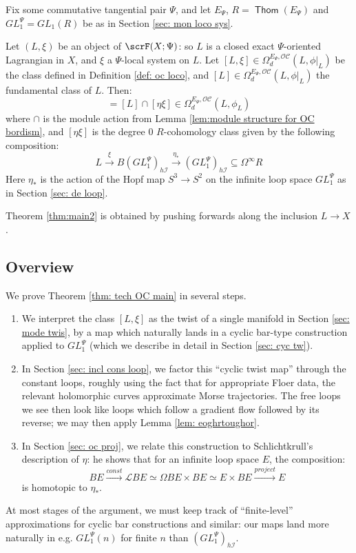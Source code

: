 \documentclass{TPmod}
\DeclareMathOperator{\Thom}{\mathsf{Thom}}
\newcommand{\cC}{\mathcal{C}}
\newcommand{\cI}{\mathcal{I}}
\newcommand{\cL}{\mathcal{L}}
\newcommand{\cO}{\mathcal{O}}
\numberwithin{equation}{section}
\begin{document}
    Fix some commutative tangential pair $\Psi$, and let $E_\Psi$, $R = \Thom(E_\Psi)$ and $GL_1^\Psi = GL_1(R)$ be as in Section \ref{sec: mon loco sys}.
    \begin{thm}\label{thm: tech OC main}
        Let $(L, \xi)$ be an object of $\scrF(X; \Psi)$: so $L$ is a closed exact $\Psi$-oriented Lagrangian in $X$, and $\xi$ a $\Psi$-local system on $L$. Let $[L, \xi] \in \Omega^{E_\Psi,\cO\cC}_d(L, \phi|_L)$ be the class defined in Definition \ref{def: oc loco}, and $[L] \in \Omega^{E_\Psi,\cO\cC}_d(L, \phi|_L)$ the fundamental class of $L$. Then:
        \begin{equation}
            [L,\xi] = [L] \cap [\eta\xi] \in \Omega_d^{E_\Psi, \cO\cC}(L, \phi_L)
        \end{equation}
        where $\cap$ is the module action from Lemma \ref{lem:module structure for OC bordism}, and $[\eta\xi]$ is the degree 0 $R$-cohomology class given by the following composition:
        \begin{equation}\label{eq: owsetrthdhdrerjgej}
            L \xrightarrow{\xi} B(GL_1^\Psi)_{h\cI} \xrightarrow{\eta_*} (GL_1^\Psi)_{h\cI} \subseteq \Omega^\infty R 
        \end{equation}
        Here $\eta_*$ is the action of the Hopf map $S^3 \to S^2$ on the infinite loop space $GL_1^\Psi$ as in Section \ref{sec: de loop}.
    \end{thm}
    Theorem \ref{thm:main2} is obtained by pushing forwards along the inclusion $L \to X$.
\subsection{Overview}
    We prove Theorem \ref{thm: tech OC main} in several steps.
    \begin{enumerate}
        \item We interpret the class $[L, \xi]$ as the twist of a single manifold in Section \ref{sec: mode twis}, by a map which naturally lands in a cyclic bar-type construction applied to $GL_1^\Psi$ (which we describe in detail in Section \ref{sec: cyc tw}).
        \item In Section \ref{sec: incl cons loop}, we factor this ``cyclic twist map'' through the constant loops, roughly using the fact that for appropriate Floer data, the relevant holomorphic curves approximate Morse trajectories. The free loops we see then look like loops which follow a gradient flow followed by its reverse; we may then apply Lemma \ref{lem: eoghrtoughor}.
        \item In Section \ref{sec: oc proj}, we relate this construction to Schlichtkrull's description of $\eta$: he shows that for an infinite loop space $E$, the composition:
        \begin{equation}
            BE \xrightarrow{const} \cL BE \simeq \Omega BE \times BE \simeq E \times BE \xrightarrow{project} E
        \end{equation}
        is homotopic to $\eta_*$.
    \end{enumerate}
    At most stages of the argument, we must keep track of ``finite-level'' approximations for cyclic bar constructions and similar: our maps land more naturally in e.g. $GL_1^\Psi(n)$ for finite $n$ than $(GL_1^\Psi)_{h\cI}$.
\end{document}
